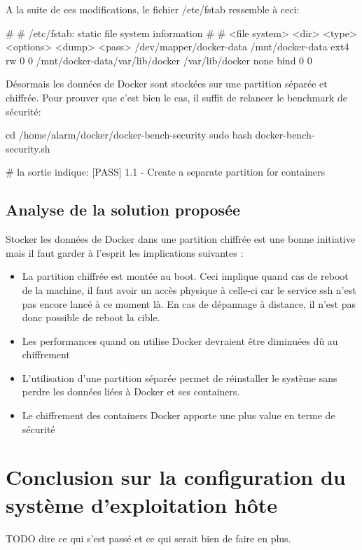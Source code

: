 \documentclass[11pt,a4paper,oneside]{report}
\begin{document}
A la suite de ces modifications, le fichier /etc/fstab ressemble à ceci:
\begin{bashcode}
#
# /etc/fstab: static file system information
#
# <file system> <dir>   <type>  <options>       <dump>  <pass>
/dev/mapper/docker-data /mnt/docker-data ext4 rw 0 0
/mnt/docker-data/var/lib/docker /var/lib/docker none bind 0 0
\end{bashcode}


Désormais les données de Docker sont stockées sur une partition séparée et chiffrée. Pour prouver que c'est bien le cas, il suffit de relancer le benchmark de sécurité:

\begin{bashcode}
cd /home/alarm/docker/docker-bench-security
sudo bash docker-bench-security.sh

# la sortie indique:
[PASS] 1.1  - Create a separate partition for containers
\end{bashcode}


\subsection{Analyse de la solution proposée}
Stocker les données de Docker dans une partition chiffrée est une bonne initiative mais il faut garder à l'esprit les implications suivantes :
\begin{itemize}

\item La partition chiffrée est montée au boot. Ceci implique quand cas de reboot de la machine, il faut avoir un accès physique à celle-ci car le service ssh n'est pas encore lancé à ce moment là. En cas de dépannage à distance, il n'est pas donc possible de reboot la cible.
\item Les performances quand on utilise Docker devraient être diminuées dû au chiffrement
\item L'utilisation d'une partition séparée permet de réinstaller le système sans perdre les données liées à Docker et ses containers.
\item Le chiffrement des containers Docker apporte une plus value en terme de sécurité
\end{itemize}

\section{Conclusion sur la configuration du système d'exploitation hôte}
TODO dire ce qui s'est passé et ce qui serait bien de faire en plus.
\end{document}
